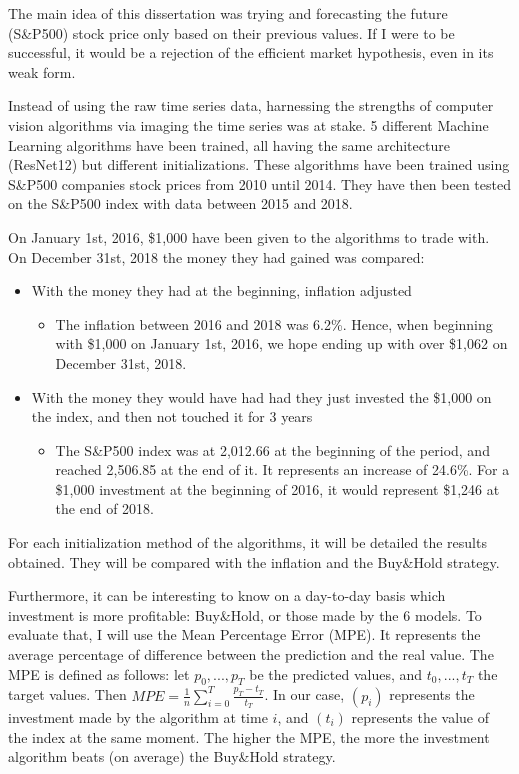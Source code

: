 \documentclass[11pt]{article}
\begin{document}
\begin{onehalfspace}
The main idea of this dissertation was trying and forecasting the future (S\&P500) stock price only based on their previous values. If I were to be successful, it would be a rejection of the efficient market hypothesis, even in its weak form. 

Instead of using the raw time series data, harnessing the strengths of computer vision algorithms via imaging the time series was at stake. 5 different Machine Learning algorithms have been trained, all having the same architecture (ResNet12) but different initializations. These algorithms have been trained using S\&P500 companies stock prices from 2010 until 2014. They have then been tested on the S\&P500 index with data between 2015 and 2018.

On January 1st, 2016, \$1,000 have been given to the algorithms to trade with. On December 31st, 2018 the money they had gained was compared:

\begin{itemize}
    \item With the money they had at the beginning, inflation adjusted
    \begin{itemize}
        \item The inflation between 2016 and 2018 was 6.2\%. Hence, when beginning with \$1,000 on January 1st, 2016, we hope ending up with over \$1,062 on December 31st, 2018.
    \end{itemize}
    \item With the money they would have had had they just invested the \$1,000 on the index, and then not touched it for 3 years
    \begin{itemize}
        \item The S\&P500 index was at 2,012.66 at the beginning of the period, and reached 2,506.85 at the end of it. It represents an increase of 24.6\%. For a \$1,000 investment at the beginning of 2016, it would represent \$1,246 at the end of 2018.
    \end{itemize}
\end{itemize}

For each initialization method of the algorithms, it will be detailed the results obtained. They will be compared with the inflation and the Buy\&Hold strategy.

Furthermore, it can be interesting to know on a day-to-day basis which investment is more profitable: Buy\&Hold, or those made by the 6 models. To evaluate that, I will use the Mean Percentage Error (MPE). It represents the average percentage of difference between the prediction and the real value. The MPE is defined as follows: let $p_0,...,p_T$ be the predicted values, and $t_0,...,t_T$ the target values. Then $MPE = \frac{1}{n} \sum\limits_{i=0}^{T} \frac{p_T - t_T}{t_T}$. In our case, $(p_i)$ represents the investment made by the algorithm at time $i$, and $(t_i)$ represents the value of the index at the same moment. The higher the MPE, the more the investment algorithm beats (on average) the Buy\&Hold strategy.


\end{onehalfspace}
\end{document}
